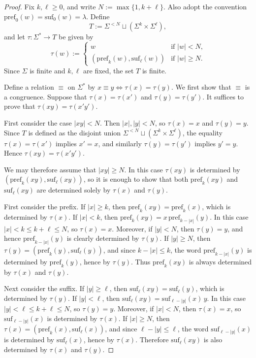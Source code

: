 \documentclass[11pt,a4paper]{article}
\newcommand{\pref}{\mathrm{pref}}
\newcommand{\suf}{\mathrm{suf}}
\begin{document}
\begin{proof}
Fix $k,\ell\ge0$, and write $N:=\max\{1,k+\ell\}$. Also adopt the
convention $\pref_0(w)=\suf_0(w)=\lambda$. Define
\[
T:=\Sigma^{<N}\sqcup(\Sigma^k\times\Sigma^\ell),
\]
and let $\tau:\Sigma^*\to T$ be given by
\[
\tau(w):=\begin{cases}
w & \text{if $|w|<N$,}\\
(\pref_k(w),\suf_\ell(w)) & \text{if $|w|\ge N$.}
\end{cases}
\]
Since $\Sigma$ is finite and $k,\ell$ are fixed, the set $T$ is finite.

Define a relation $\equiv$ on $\Sigma^*$ by
$x\equiv y \iff \tau(x)=\tau(y)$. We first show that $\equiv$ is a
congruence. Suppose that $\tau(x)=\tau(x')$ and $\tau(y)=\tau(y')$.
It suffices to prove that $\tau(xy)=\tau(x'y')$.

First consider the case $|xy|<N$. Then $|x|,|y|<N$, so
$\tau(x)=x$ and $\tau(y)=y$. Since $T$ is defined as the disjoint union
$\Sigma^{<N}\sqcup(\Sigma^k\times\Sigma^\ell)$, the equality
$\tau(x)=\tau(x')$ implies $x'=x$, and similarly $\tau(y)=\tau(y')$
implies $y'=y$. Hence $\tau(xy)=\tau(x'y')$.

We may therefore assume that $|xy|\ge N$. In this case $\tau(xy)$ is
determined by $(\pref_k(xy),\suf_\ell(xy))$, so it is enough to show
that both $\pref_k(xy)$ and $\suf_\ell(xy)$ are determined solely by
$\tau(x)$ and $\tau(y)$.

First consider the prefix. If $|x|\ge k$, then $\pref_k(xy)=\pref_k(x)$,
which is determined by $\tau(x)$. If $|x|<k$, then
$\pref_k(xy)=x\,\pref_{k-|x|}(y)$. In this case $|x|<k\le k+\ell\le N$,
so $\tau(x)=x$. Moreover, if $|y|<N$, then $\tau(y)=y$, and hence
$\pref_{k-|x|}(y)$ is clearly determined by $\tau(y)$. If $|y|\ge N$,
then $\tau(y)=(\pref_k(y),\suf_\ell(y))$, and since $k-|x|\le k$, the
word $\pref_{k-|x|}(y)$ is determined by $\pref_k(y)$, hence by
$\tau(y)$. Thus $\pref_k(xy)$ is always determined by $\tau(x)$ and
$\tau(y)$.

Next consider the suffix. If $|y|\ge\ell$, then $\suf_\ell(xy)=\suf_\ell(y)$,
which is determined by $\tau(y)$. If $|y|<\ell$, then
$\suf_\ell(xy)=\suf_{\ell-|y|}(x)\,y$. In this case
$|y|<\ell\le k+\ell\le N$, so $\tau(y)=y$. Moreover, if $|x|<N$, then
$\tau(x)=x$, so $\suf_{\ell-|y|}(x)$ is determined by $\tau(x)$. If
$|x|\ge N$, then $\tau(x)=(\pref_k(x),\suf_\ell(x))$, and since
$\ell-|y|\le\ell$, the word $\suf_{\ell-|y|}(x)$ is determined by
$\suf_\ell(x)$, hence by $\tau(x)$. Therefore $\suf_\ell(xy)$ is also
determined by $\tau(x)$ and $\tau(y)$.


\end{proof}
\end{document}
